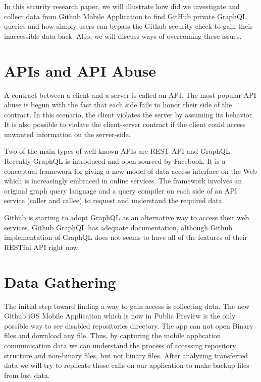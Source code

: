 \documentclass[conference]{IEEEtran}
\begin{document}
In this security research paper, we will illustrate how did we investigate and collect data from Github Mobile Application to find GitHub private GraphQL queries and how simply users can bypass the Github security check to gain their inaccessible data back. Also, we will discuss ways of overcoming these issues.

\section{APIs and API Abuse}

A contract between a client and a server is called an API. The most popular API abuse is begun with the fact that each side fails to honor their side of the contract. In this scenario, the client violates the server by assuming its behavior\cite{chess2007secure}. It is also possible to violate the client-server contract if the client could access unwanted information on the server-side.

Two of the main types of well-known APIs are REST API\cite{masse2011rest} and GraphQL. Recently GraphQL is introduced and open-sourced by Facebook. It is a conceptual framework for giving a new model of data access interface on the Web which is increasingly embraced in online services\cite{hartig2017initial}. The framework involves an original graph query language and a query compiler on each side of an API service (caller and callee) to request and understand the required data. 

Github is starting to adopt GraphQL as an alternative way to access their web services. Github GraphQL has adequate documentation, although Github implementation of GraphQL does not seems to have all of the features of their RESTful API right now.


\section{Data Gathering}

The initial step toward finding a way to gain access is collecting data. The new Github iOS Mobile Application which is now in Public Preview is the only possible way to see disabled repositories directory. The app can not open Binary files and download any file. Thus, by capturing the mobile application communication data we can understand the process of accessing repository structure and non-binary files, but not binary files. After analyzing transferred data we will try to replicate those calls on our application to make backup files from lost data.
\end{document}
